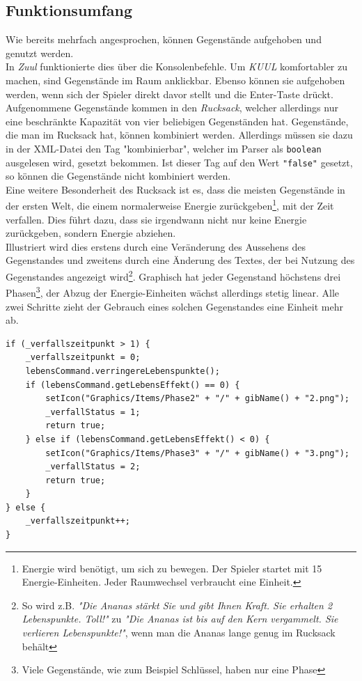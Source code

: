 \documentclass[12pt,twoside]{article}
\theoremstyle{plain}
\theoremstyle{definition}
\theoremstyle{remark}
\begin{document}
\subsection{Funktionsumfang}
\label{ssec:main_func}
Wie bereits mehrfach angesprochen, können Gegenstände aufgehoben und genutzt werden.\\
In \textit{Zuul} funktionierte dies über die Konsolenbefehle.
Um \textit{KUUL} komfortabler zu machen, sind Gegenstände im Raum anklickbar.
Ebenso können sie aufgehoben werden, wenn sich der Spieler direkt davor stellt und die Enter-Taste drückt.\\
Aufgenommene Gegenstände kommen in den \textit{Rucksack}, welcher allerdings nur eine beschränkte Kapazität von vier beliebigen Gegenständen hat.
Gegenstände, die man im Rucksack hat, können kombiniert werden.
Allerdings müssen sie dazu in der XML-Datei den Tag "kombinierbar", welcher im Parser als \texttt{boolean} ausgelesen wird, gesetzt bekommen.
Ist dieser Tag auf den Wert \texttt{"false"} gesetzt, so können die Gegenstände nicht kombiniert werden.\\
Eine weitere Besonderheit des Rucksack ist es, dass die meisten Gegenstände in der ersten Welt, die einem normalerweise Energie zurückgeben\footnote{Energie wird benötigt, um sich zu bewegen. Der Spieler startet mit 15 Energie-Einheiten. Jeder Raumwechsel verbraucht eine Einheit.}, mit der Zeit verfallen.
Dies führt dazu, dass sie irgendwann nicht nur keine Energie zurückgeben, sondern Energie abziehen.\\
Illustriert wird dies erstens durch eine Veränderung des Aussehens des Gegenstandes und zweitens durch eine Änderung des Textes, der bei Nutzung des Gegenstandes angezeigt wird\footnote{So wird z.B. \textit{"Die Ananas stärkt Sie und gibt Ihnen Kraft. Sie erhalten 2 Lebenspunkte. Toll!"} zu \textit{"Die Ananas ist bis auf den Kern vergammelt. Sie verlieren Lebenspunkte!"}, wenn man die Ananas lange genug im Rucksack behält}.
Graphisch hat jeder Gegenstand höchstens drei Phasen\footnote{Viele Gegenstände, wie zum Beispiel Schlüssel, haben nur eine Phase}, der Abzug der Energie-Einheiten wächst allerdings stetig linear.
Alle zwei Schritte zieht der Gebrauch eines solchen Gegenstandes eine Einheit mehr ab.
\begin{lstlisting}[caption=Teilimplementation der Verringerung der Energieregeneration, label=code:main_func]
if (_verfallszeitpunkt > 1) {
	_verfallszeitpunkt = 0;
	lebensCommand.verringereLebenspunkte();
	if (lebensCommand.getLebensEffekt() == 0) {
		setIcon("Graphics/Items/Phase2" + "/" + gibName() + "2.png");
		_verfallStatus = 1;
		return true;
	} else if (lebensCommand.getLebensEffekt() < 0) {
		setIcon("Graphics/Items/Phase3" + "/" + gibName() + "3.png");
		_verfallStatus = 2;
		return true;
	}
} else {
	_verfallszeitpunkt++;
}
\end{lstlisting}
\end{document}
